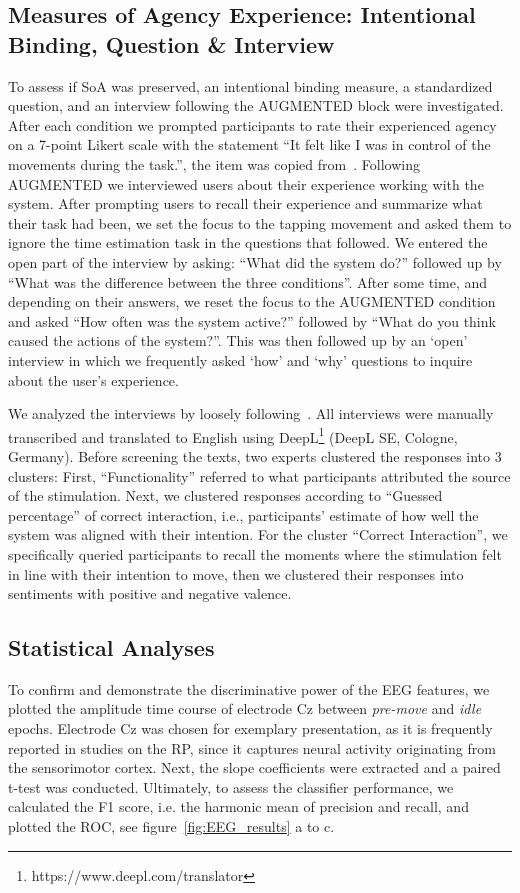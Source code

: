 \subsection{Measures of Agency Experience: Intentional Binding, Question \& Interview}
To assess if SoA was preserved, an intentional binding measure, a standardized question, and an interview following the AUGMENTED block were investigated. After each condition we prompted participants to rate their experienced agency on a 7-point Likert scale with the statement ``It felt like I was in control of the movements during the task.'', the item was copied from~\cite{Bergstrom2022-fb}. Following AUGMENTED we interviewed users about their experience working with the system. After prompting users to recall their experience and summarize what their task had been, we set the focus to the tapping movement and asked them to ignore the time estimation task in the questions that followed. We entered the open part of the interview by asking: ``What did the system do?'' followed up by ``What was the difference between the three conditions''. After some time, and depending on their answers, we reset the focus to the AUGMENTED condition and asked ``How often was the system active?'' followed by ``What do you think caused the actions of the system?''. This was then followed up by an `open' interview in which we frequently asked `how' and `why' questions to inquire about the user's experience.

We analyzed the interviews by loosely following~\citet{Mayring2015-pp}. All interviews were manually transcribed and translated to English using DeepL\footnote{https://www.deepl.com/translator} (DeepL SE, Cologne, Germany). Before screening the texts, two experts clustered the responses into 3 clusters: First, ``Functionality'' referred to what participants attributed the source of the stimulation. Next, we clustered responses according to ``Guessed percentage'' of correct interaction, i.e., participants' estimate of how well the system was aligned with their intention. For the cluster ``Correct Interaction'', we specifically queried participants to recall the moments where the stimulation felt in line with their intention to move, then we clustered their responses into sentiments with positive and negative valence. 

\subsection{Statistical Analyses}
To confirm and demonstrate the discriminative power of the EEG features, we plotted the amplitude time course of electrode Cz between \textit{pre-move} and \textit{idle} epochs. Electrode Cz was chosen for exemplary presentation, as it is frequently reported in studies on the RP, since it captures neural activity originating from the sensorimotor cortex. Next, the slope coefficients were extracted and a paired t-test was conducted. Ultimately, to assess the classifier performance, we calculated the F1 score, i.e. the harmonic mean of precision and recall, and plotted the ROC, see figure~\ref{fig:EEG_results} a to c.

